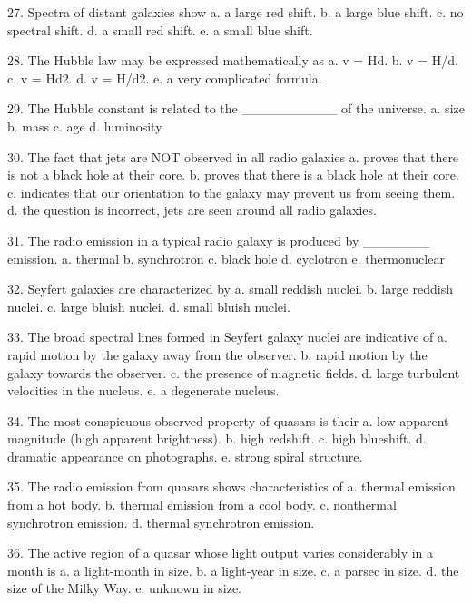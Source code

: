  27. Spectra of distant galaxies show
      a.  a large red shift.
      b.  a large blue shift.
      c.  no spectral shift.
      d.  a small red shift.
      e.  a small blue shift.
 
 28. The Hubble law may be expressed mathematically as
      a.  v = Hd.
      b.  v = H/d.
      c.  v = Hd2.
      d.  v = H/d2.
      e.  a very complicated formula.
      
 29. The Hubble constant is related to the __________ of the universe.
      a.  size
      b.  mass
      c.  age
      d.  luminosity
      
 30. The fact that jets are NOT observed in all radio galaxies
      a.  proves that there is not a black hole at their core.
      b.  proves that there is a black hole at their core.
      c.  indicates that our orientation to the galaxy may prevent us from seeing them.
      d.  the question is incorrect, jets are seen around all radio galaxies.
      
 31. The radio emission in a typical radio galaxy is produced by _______ emission.
      a.  thermal
      b.  synchrotron
      c.  black hole
      d.  cyclotron
      e.  thermonuclear
      
 32. Seyfert galaxies are characterized by
      a.  small reddish nuclei.
      b.  large reddish nuclei.
      c.  large bluish nuclei.
      d.  small bluish nuclei.
      
 33. The broad spectral lines formed in Seyfert galaxy nuclei are indicative of
      a.  rapid motion by the galaxy away from the observer.
      b.  rapid motion by the galaxy towards the observer.
      c.  the presence of magnetic fields.
      d.  large turbulent velocities in the nucleus.
      e.  a degenerate nucleus.
      
 34. The most conspicuous observed property of quasars is their
      a.  low apparent magnitude (high apparent brightness).
      b.  high redshift.
      c.  high blueshift.
      d.  dramatic appearance on photographs.
      e.  strong spiral structure.
 
 35. The radio emission from quasars shows characteristics of
      a.  thermal emission from a hot body.
      b.  thermal emission from a cool body.
      c.  nonthermal synchrotron emission.
      d.  thermal synchrotron emission.
      
 36. The active region of a quasar whose light output varies considerably in a month is
      a.  a light-month in size.
      b.  a light-year in size.
      c.  a parsec in size.
      d.  the size of the Milky Way.
      e.  unknown in size.
      
